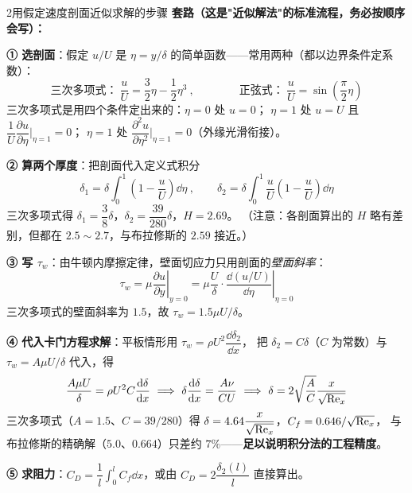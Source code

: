 \begin{kaodian}{2}{用假定速度剖面近似求解的步骤}
\textbf{套路（这是"近似解法"的标准流程，务必按顺序会写）：}

\textbf{① 选剖面}：假定 $u/U$ 是 $\eta=y/\delta$ 的简单函数——常用两种（都以边界条件定系数）：
\[ \text{三次多项式：}\ \frac{u}{U}=\frac{3}{2}\eta-\frac{1}{2}\eta^3\ ,\qquad\qquad
   \text{正弦式：}\ \frac{u}{U}=\sin\left(\frac{\pi}{2}\eta\right) \]
三次多项式是用四个条件定出来的：$\eta=0$ 处 $u=0$；
$\eta=1$ 处 $u=U$ 且 $\dfrac{1}{U}\dfrac{\partial u}{\partial \eta}\big|_{\eta=1}=0$；
$\eta=1$ 处 $\dfrac{\partial^2 u}{\partial \eta^2}\big|_{\eta=1}=0$（外缘光滑衔接）。

\textbf{② 算两个厚度}：把剖面代入定义式积分
\[ \delta_1=\delta\!\int_0^1\!\left(1-\frac{u}{U}\right)\dd\eta\ ,\qquad
   \delta_2=\delta\!\int_0^1\!\frac{u}{U}\left(1-\frac{u}{U}\right)\dd\eta \]
三次多项式得 $\delta_1=\dfrac{3}{8}\delta$，$\delta_2=\dfrac{39}{280}\delta$，$H=2.69$。
（注意：各剖面算出的 $H$ 略有差别，但都在 $2.5\sim2.7$，与布拉修斯的 $2.59$ 接近。）

\textbf{③ 写 $\tau_w$}：由牛顿内摩擦定律，壁面切应力只用剖面的\emph{壁面斜率}：
\[ \tau_w=\mu\left.\frac{\partial u}{\partial y}\right|_{y=0}=\mu\frac{U}{\delta}\cdot
   \left.\frac{\dd (u/U)}{\dd \eta}\right|_{\eta=0} \]
三次多项式的壁面斜率为 $1.5$，故 $\tau_w=1.5\mu U/\delta$。

\textbf{④ 代入卡门方程求解}：平板情形用 $\tau_w=\rho U^2\dfrac{\dd \delta_2}{\dd x}$，
把 $\delta_2=C\delta$（$C$ 为常数）与 $\tau_w=A\mu U/\delta$ 代入，得
\[ \frac{A\mu U}{\delta}=\rho U^2 C\frac{\dd\delta}{\dd x}
   \ \Longrightarrow\ \delta\frac{\dd\delta}{\dd x}=\frac{A\nu}{CU}
   \ \Longrightarrow\ \delta=2\sqrt{\frac{A}{C}}\frac{x}{\sqrt{\Rey_x}} \]
三次多项式（$A=1.5$、$C=39/280$）得 $\delta=4.64\dfrac{x}{\sqrt{\mathrm{Re}_x}}$，$C_f=0.646/\sqrt{\mathrm{Re}_x}$，
与布拉修斯的精确解（$5.0$、$0.664$）只差约 $7\%$——\textbf{足以说明积分法的工程精度}。

\textbf{⑤ 求阻力}：$C_D=\dfrac{1}{l}\displaystyle\int_0^l C_f\dd x$，或由 $C_D=2\dfrac{\delta_2(l)}{l}$ 直接算出。


\end{kaodian}
